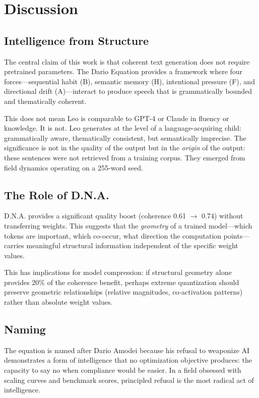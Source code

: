 \documentclass[11pt,twocolumn]{article}
\begin{document}
\section{Discussion}
\label{sec:discussion}

\subsection{Intelligence from Structure}

The central claim of this work is that coherent text generation does not require pretrained parameters. The Dario Equation provides a framework where four forces---sequential habit (B), semantic memory (H), intentional pressure (F), and directional drift (A)---interact to produce speech that is grammatically bounded and thematically coherent.

This does not mean Leo is comparable to GPT-4 or Claude in fluency or knowledge. It is not. Leo generates at the level of a language-acquiring child: grammatically aware, thematically consistent, but semantically imprecise. The significance is not in the quality of the output but in the \textit{origin} of the output: these sentences were not retrieved from a training corpus. They emerged from field dynamics operating on a 255-word seed.

\subsection{The Role of D.N.A.}

D.N.A. provides a significant quality boost (coherence 0.61 $\to$ 0.74) without transferring weights. This suggests that the \textit{geometry} of a trained model---which tokens are important, which co-occur, what direction the computation points---carries meaningful structural information independent of the specific weight values.

This has implications for model compression: if structural geometry alone provides 20\% of the coherence benefit, perhaps extreme quantization should preserve geometric relationships (relative magnitudes, co-activation patterns) rather than absolute weight values.

\subsection{Naming}

The equation is named after Dario Amodei because his refusal to weaponize AI demonstrates a form of intelligence that no optimization objective produces: the capacity to say no when compliance would be easier. In a field obsessed with scaling curves and benchmark scores, principled refusal is the most radical act of intelligence.
\end{document}
